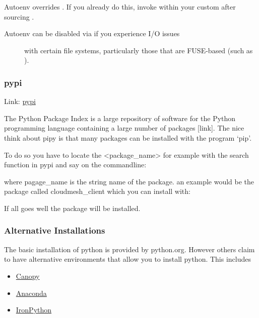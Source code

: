 Autoenv overrides . If you already do this, invoke
 within your custom  after sourcing
.
\begin{description}
\item[{Autoenv can be disabled via  if you experience I/O issues}] \leavevmode
with certain file systems, particularly those that are FUSE-based
(such as ).

\end{description}


\subsubsection{pypi}
\label{\detokenize{lesson/prg/python_intro:pypi}}
Link: \href{https://pypi.python.org/pypi}{pypi}

The Python Package Index is a large repository of software for the
Python programming language containing a large number of packages
{[}link{]}. The nice think about pipy is that many packages can be
installed with the program `pip'.

To do so you have to locate the \textless{}package\_name\textgreater{} for example with the
search function in pypi and say on the commandline:

\begin{sphinxVerbatim}[commandchars=\\\{\}]
  
\end{sphinxVerbatim}

where pagage\_name is the string name of the package. an example would
be the package called cloudmesh\_client which you can install with:

\begin{sphinxVerbatim}[commandchars=\\\{\}]
  
\end{sphinxVerbatim}

If all goes well the package will be installed.


\subsubsection{Alternative Installations}
\label{\detokenize{lesson/prg/python_intro:alternative-installations}}
The basic installation of python is provided by python.org. However
others claim to have alternative environments that allow you to
install python. This includes
\begin{itemize}
\item {} 
\href{https://store.enthought.com/downloads/\#default}{Canopy}

\item {} 
\href{https://www.continuum.io/downloads}{Anaconda}

\item {} 
\href{http://ironpython.net/}{IronPython}

\end{itemize}

